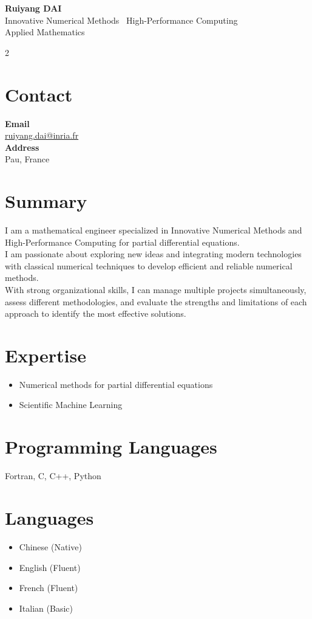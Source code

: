 \documentclass[10pt,a4paper]{article}
\newcommand{\sideheading}[1]{\section*{#1}}
\begin{document}
\begin{center}
  {\LARGE\bfseries\color{accent} Ruiyang DAI}\\[3pt]
  {\normalsize Innovative Numerical Methods \textbullet\ High-Performance Computing}\\
  {\normalsize Applied Mathematics}
\end{center}
\vspace{-4pt}

\begin{paracol}{2}
\setlength{\columnsep}{0.7cm}

\sideheading{Contact}
\small
\textbf{Email}\\
\href{mailto:ruiyang.dai@inria.fr}{ruiyang.dai@inria.fr}\\[3pt]
\textbf{Address}\\
Pau, France
\normalsize

\sideheading{Summary}
I am a mathematical engineer specialized in 
Innovative Numerical Methods and High-Performance Computing 
for partial differential equations.\\[3pt]

I am passionate about exploring new ideas and integrating modern technologies 
with classical numerical techniques 
to develop efficient and reliable numerical methods.\\[3pt]

With strong organizational skills, 
I can manage multiple projects simultaneously, 
assess different methodologies, 
and evaluate the strengths and limitations of each approach 
to identify the most effective solutions.

\sideheading{Expertise}
\begin{itemize}
  \item Numerical methods for partial differential equations
  \item Scientific Machine Learning
\end{itemize}

\sideheading{Programming Languages}
Fortran, C, C++, Python

\sideheading{Languages}
\begin{itemize}
  \item Chinese (Native)
  \item English (Fluent)
  \item French  (Fluent)
  \item Italian (Basic)
\end{itemize}


\end{paracol}
\end{document}
